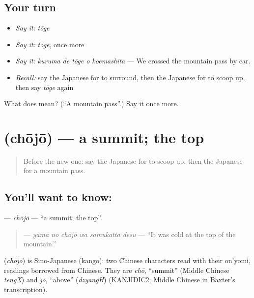 \subsection*{Your turn}
\begin{itemize}
\raggedright
  \item \emph{Say it:} \emph{tōge}
  \item \emph{Say it:} \emph{tōge}, once more
  \item \emph{Say it:} \emph{kuruma de tōge o koemashita} — We crossed the mountain pass by car.
  \item \emph{Recall:} say the Japanese for to surround, then the Japanese for to scoop up, then say \emph{tōge} again
\end{itemize}

\begin{tcolorbox}[breakable,colback=teal!4,colframe=teal!35!black,title={Before you move on}]
What does  mean? (\textquotedblleft{}A mountain pass\textquotedblright{}.) Say it once more.
\end{tcolorbox}
\section[\texorpdfstring{\ja{ちょうじょう} (chōjō)}{ちょうじょう (chōjō)}]{ (chōjō) — a summit; the top}

\label{lesson:JA-C412-choujou}



\begin{quote}
Before the new one: say the Japanese for to scoop up, then the Japanese for a mountain pass.
\end{quote}

\subsection*{You'll want to know: }
\textbf{} — \emph{chōjō} — \textquotedblleft{}a summit; the top\textquotedblright{}.

\begin{quote}
\textbf{  } — \emph{yama no chōjō wa samukatta desu} — \textquotedblleft{}It was cold at the top of the mountain.\textquotedblright{}
\end{quote}

\begin{cousinweb}
\textbf{} (\emph{chōjō}) is Sino-Japanese (kango): two Chinese characters read with their on'yomi, readings borrowed from Chinese. They are \emph{chō}, \textquotedblleft{}summit\textquotedblright{} (Middle Chinese \emph{tengX}) and \emph{jō}, \textquotedblleft{}above\textquotedblright{} (\emph{dzyangH}) (KANJIDIC2; Middle Chinese in Baxter's transcription).
\end{cousinweb}

